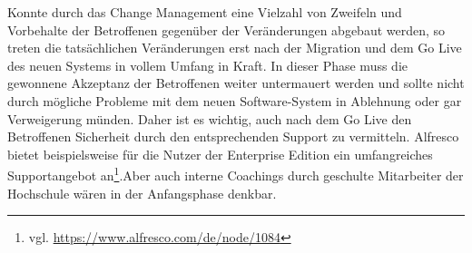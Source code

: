 Konnte durch das Change Management eine Vielzahl von Zweifeln und Vorbehalte der Betroffenen gegenüber der Veränderungen abgebaut werden, so treten die tatsächlichen Veränderungen erst nach der Migration und dem Go Live des neuen Systems in vollem Umfang in Kraft. In dieser Phase muss die gewonnene Akzeptanz der Betroffenen weiter untermauert werden und sollte nicht durch mögliche Probleme mit dem neuen Software-System in Ablehnung oder gar Verweigerung münden. Daher ist es wichtig, auch nach dem Go Live den Betroffenen Sicherheit durch den entsprechenden Support zu vermitteln. Alfresco bietet beispielsweise für die Nutzer der Enterprise Edition ein umfangreiches Supportangebot an\footnote{vgl. \url{https://www.alfresco.com/de/node/1084}}.Aber auch interne Coachings durch geschulte Mitarbeiter der Hochschule wären in der Anfangsphase denkbar. 
